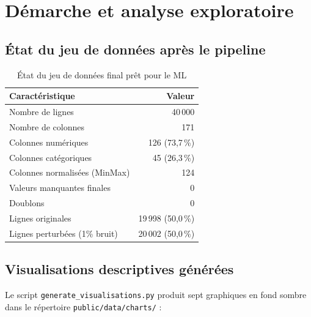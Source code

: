 \documentclass[12pt,a4paper,oneside]{report}
\newcommand{\pct}[1]{#1\,\%}
\begin{document}
\chapter{Démarche et analyse exploratoire}

\section{État du jeu de données après le pipeline}

\begin{table}[H]
  \centering
  \caption{État du jeu de données final prêt pour le ML}
  \label{tab:etat_final}
  \begin{tabular}{lr}
    \toprule
    \textbf{Caractéristique} & \textbf{Valeur} \\
    \midrule
    Nombre de lignes              & 40\,000 \\
    Nombre de colonnes            & 171 \\
    Colonnes numériques           & 126 (\pct{73,7}) \\
    Colonnes catégoriques         & 45 (\pct{26,3}) \\
    Colonnes normalisées (MinMax) & 124 \\
    Valeurs manquantes finales    & 0 \\
    Doublons                      & 0 \\
    Lignes originales             & 19\,998 (\pct{50,0}) \\
    Lignes perturbées (1\% bruit) & 20\,002 (\pct{50,0}) \\
    \bottomrule
  \end{tabular}
\end{table}

\section{Visualisations descriptives générées}

Le script \texttt{generate\_visualisations.py} produit sept graphiques en fond sombre dans le répertoire \texttt{public/data/charts/} :
\end{document}
